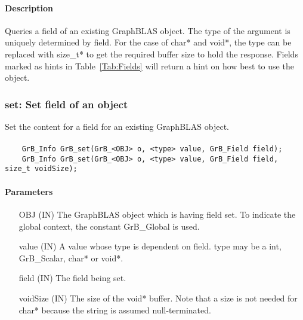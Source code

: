 \paragraph{Description}

Queries a field of an existing GraphBLAS object.
The type of the argument is uniquely determined by {\sf field}.
For the case of {\sf char*} and {\sf void*}, the type can be replaced with {\sf size\_t*}
to get the required buffer size to hold the response.
Fields marked as hints in Table~\ref{Tab:Fields} will return a hint on how best to use the
object.

\subsubsection{{\sf set}: Set field of an object}

Set the content for a field for an existing GraphBLAS object.

\paragraph{\syntax}

\begin{verbatim}
    GrB_Info GrB_set(GrB_<OBJ> o, <type> value, GrB_Field field);
    GrB_Info GrB_set(GrB_<OBJ> o, <type> value, GrB_Field field, size_t voidSize);
\end{verbatim}

\paragraph{Parameters}

\begin{itemize}[leftmargin=2.1in]
    \item[{\sf OBJ}] ({\sf IN}) The GraphBLAS object which is having {\sf field} set.
                                To indicate the global context, the constant {\sf GrB\_Global} is used.
    \item[{\sf value}] ({\sf IN}) A value whose type is dependent on {\sf field}.
                                {\sf type} may be a {\sf int}, {\sf GrB\_Scalar}, {\sf char*} or {\sf void*}.
    \item[{\sf field}] ({\sf IN}) The field being set.
    \item[{\sf voidSize}] ({\sf IN}) The size of the {\sf void*} buffer. Note that a size is not needed for
                                {\sf char*} because the string is assumed null-terminated.
\end{itemize}


